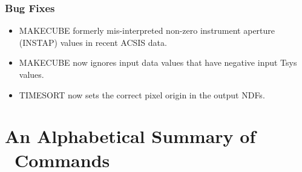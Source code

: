\documentclass[oneside,11pt]{starlink}
\begin{document}
\subsubsection*{Bug Fixes}

\begin{itemize}
\item MAKECUBE formerly mis-interpreted non-zero instrument aperture (INSTAP) values in recent ACSIS data.
\item MAKECUBE now ignores input data values that have negative input Tsys values.
\item TIMESORT now sets the correct pixel origin in the output NDFs.
\end{itemize}

\newpage

\appendix
\ifdefined\HCode
\else

\section{An Alphabetical Summary of \SMURF\ Commands
\label{ap:summary}}
\end{document}
